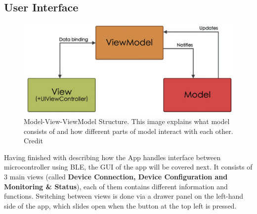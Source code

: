 \newpage
\subsection{User Interface}
\begin{figure}
	\centering
	\includegraphics[width=0.7\linewidth]{Figures/Screenshot_16}
	\caption[Model-View-ViewModel Structure]{Model-View-ViewModel Structure. This image explains what model consists of and how different parts of model interact with each other. Credit \cite{García2023}}
	\label{fig:screenshot16}
\end{figure}

Having finished with describing how the App handles interface between microcontroller using \ac{BLE}, the \ac{GUI} of the app will be covered next. It consists of 3 main views (called \textbf{Device Connection, Device Configuration and Monitoring \&  Status}), each of them contains different information and functions. Switching between views is done via a drawer panel on the left-hand side of the app, which slides open when the button at the top left is pressed.


